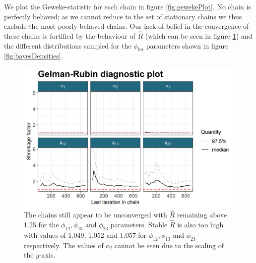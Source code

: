 \documentclass[]{article}
\begin{document}
We plot the Geweke-statistic for each chain in figure \ref{fig:gewekePlot}. No chain is perfectly behaved; as we cannot reduce to the set of stationary chains we thus exclude the most poorly behaved chains. Our lack of belief in the convergence of these chains is fortified by the behaviour of $\hat{R}$ (which can be seen in figure \ref{fig:gelmanPlot}) and the different distributions sampled for the $\phi_{lm}$ parameters shown in figure \ref{fig:bayesDensities}.
\begin{figure}
	\centering
	\includegraphics[scale=1.0]{./Images/Yeast/Convergence/gelmanPlot.png}
	\caption{The chains still appear to be unconverged with $\hat{R}$ remaining above 1.25 for the $\phi_{12}, \phi_{13}$ and $\phi_{23}$ parameters. Stable $\hat{R}$ is also too high with values of 1.049, 1.052 and 1.057 for $\phi_{12}, \phi_{13}$ and $\phi_{23}$ respectively. The values of $\alpha_l$ cannot be seen due to the scaling of the $y$-axis.}
	\label{fig:gelmanPlot}
\end{figure}
\end{document}
